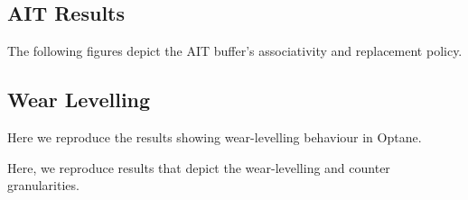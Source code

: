 \documentclass[letterpaper,twocolumn,10pt]{article}
\begin{document}
\subsection{AIT Results}
The following figures depict the AIT buffer's associativity and replacement policy.
\begin{figure}[H]
\centering
\begin{subfigure}[b]{0.52\hsize}
\adjustbox{}{}
\end{subfigure}
\begin{subfigure}[b]{0.45\hsize}
\adjustbox{}{}
\end{subfigure}
\label{fig:ait_reverse}
\vspace{-0.4cm}
\end{figure}

\subsection{Wear Levelling}
Here we reproduce the results showing wear-levelling behaviour in Optane.
\begin{figure}[H]
{}
\label{fig:wear_leveling_timing}
\vspace{-0.4cm}
\end{figure}
\begin{figure}[H]
\centering

\label{fig:wear-leveling-readwrite}
\vspace{-0.4cm}
\end{figure}

Here, we reproduce results that depict the wear-levelling and counter granularities.
\begin{figure}[H]
\centering
\begin{subfigure}[b]{0.49\hsize}

\end{subfigure}
\begin{subfigure}[b]{0.49\hsize}

\end{subfigure}
\label{fig:wear-leveling-granularity}
\end{figure}
\end{document}

